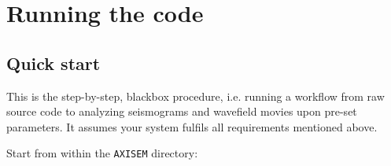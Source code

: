 \documentclass{article}
\begin{document}
\newpage
\section{Running the code}
\subsection{Quick start}
This is the step-by-step, blackbox procedure, i.e. running a workflow from raw source code to analyzing 
seismograms and wavefield movies upon pre-set parameters. It assumes your system fulfils all requirements mentioned above.\\
\begin{center}
\end{center}

\noindent Start from within the {\tt AXISEM} directory:
\end{document}
